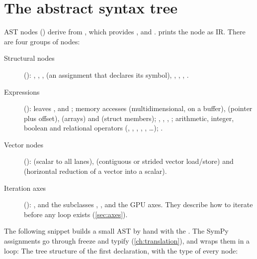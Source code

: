 \section{The abstract syntax tree}\label{sec:ast}

AST nodes () derive from , which provides
,  and .  prints
the node as IR. There are four groups of nodes:

\begin{description}
  \item[Structural nodes] (): , ,
    ,  (an assignment that declares its symbol),
    , , , .
  \item[Expressions] (): leaves ,
     and ; memory accesses 
    (multidimensional, on a buffer),  (pointer plus offset),
     (arrays) and  (struct members); ,
    , , ; arithmetic, integer, boolean and
    relational operators (, , , ,
    , \dots); .
  \item[Vector nodes] ():  (scalar to all lanes),
     (contiguous or strided vector load/store) and
     (horizontal reduction of a vector into a scalar).
  \item[Iteration axes] (): ,  and the
     subclasses , ,
     and the GPU axes. They describe how to iterate before any loop
    exists (\cref{sec:axes}).
\end{description}

The following snippet builds a small AST by hand with the . The SymPy
assignments go through freeze and typify (\cref{ch:translation}), and  wraps
them in a loop:
The tree structure of the first declaration, with the type of every node:

